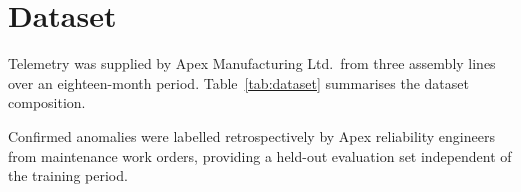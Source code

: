 \section{Dataset}
Telemetry was supplied by Apex Manufacturing Ltd.\ from three assembly lines over an
eighteen-month period. Table~\ref{tab:dataset} summarises the dataset composition.

\begin{table}[htbp]
\centering
\caption{Summary of the Apex Manufacturing telemetry dataset.}
\label{tab:dataset}
\end{table}

Confirmed anomalies were labelled retrospectively by Apex reliability engineers from
maintenance work orders, providing a held-out evaluation set independent of the training
period.

